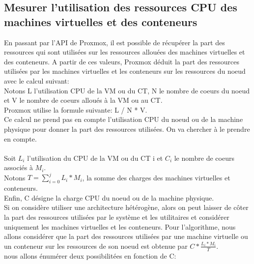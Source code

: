 \documentclass[14pt]{extarticle}
\begin{document}
    \subsection{Mesurer l'utilisation des ressources CPU des machines virtuelles et des conteneurs}
    En passant par l'API de Proxmox, il est possible de récupérer la part des ressources qui sont utilisées sur les ressources allouées des machines virtuelles et des conteneurs. A partir de ces valeurs, Proxmox déduit la part des ressources utilisées par les machines virtuelles et les conteneurs sur les ressources du noeud avec le calcul suivant:\\
    Notons L l'utilisation CPU de la VM ou du CT, N le nombre de coeurs du noeud et V le nombre de coeurs alloués à la VM ou au CT.\\
    Proxmox utilise la formule suivante: L / N * V.\\
    Ce calcul ne prend pas en compte l'utilisation CPU du noeud ou de la machine physique pour donner la part des ressources utilisées. On va chercher à le prendre en compte.\\
    \\
    Soit $L_i$ l'utilisation du CPU de la VM ou du CT i et $C_i$ le nombre de coeurs associés à $M_i$.\\
    Notons $T = \sum_{i = 0}^j L_i * M_i$, la somme des charges des machines virtuelles et conteneurs.\\
    Enfin, C désigne la charge CPU du noeud ou de la machine physique.\\
    Si on considère utiliser une architecture hétérogène, alors on peut laisser de côter la part des ressources utilisées par le système et les utilitaires et considérer uniquement les machines virtuelles et les conteneurs. Pour l'algorithme, nous allons considérer que la part des ressources utilisées par une machine virtuelle ou un conteneur sur les ressources de son noeud est obtenue par $C * \frac{L_i * M_i}{T}$.\\
    \newpage
    \noindent
    nous allons énumérer deux possibilitées en fonction de C:
\end{document}
